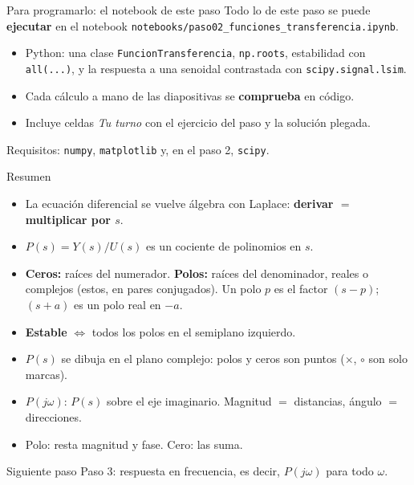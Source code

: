 \documentclass[aspectratio=169,11pt]{beamer}
\begin{document}
\begin{frame}{Para programarlo: el notebook de este paso}
  \small
  Todo lo de este paso se puede \textbf{ejecutar} en el notebook \texttt{notebooks/paso02\_funciones\_transferencia.ipynb}.
  \begin{itemize}
    \item Python: una clase \texttt{FuncionTransferencia}, \texttt{np.roots}, estabilidad con \texttt{all(...)}, y la respuesta a una senoidal contrastada con \texttt{scipy.signal.lsim}.
    \item Cada cálculo a mano de las diapositivas se \textbf{comprueba} en código.
    \item Incluye celdas \emph{Tu turno} con el ejercicio del paso y la solución plegada.
  \end{itemize}
  \footnotesize Requisitos: \texttt{numpy}, \texttt{matplotlib} y, en el paso 2, \texttt{scipy}.
\end{frame}

\begin{frame}{Resumen}
  \begin{itemize}
    \item La ecuación diferencial se vuelve álgebra con Laplace: \textbf{derivar $=$ multiplicar por $s$}.
    \item $P(s)=Y(s)/U(s)$ es un cociente de polinomios en $s$.
    \item \textbf{Ceros:} raíces del numerador. \textbf{Polos:} raíces del denominador, reales o complejos (estos, en pares conjugados). Un polo $p$ es el factor $(s-p)$; $(s+a)$ es un polo real en $-a$.
    \item \textbf{Estable} $\iff$ todos los polos en el semiplano izquierdo.
    \item $P(s)$ se dibuja en el plano complejo: polos y ceros son puntos ($\times$, $\circ$ son solo marcas).
    \item $P(j\omega)$: $P(s)$ sobre el eje imaginario. Magnitud $=$ distancias, ángulo $=$ direcciones.
    \item Polo: resta magnitud y fase. Cero: las suma.
  \end{itemize}
  \vspace{6pt}
  \begin{block}{Siguiente paso}
    Paso 3: respuesta en frecuencia, es decir, $P(j\omega)$ para todo $\omega$.
  \end{block}
\end{frame}
\end{document}

